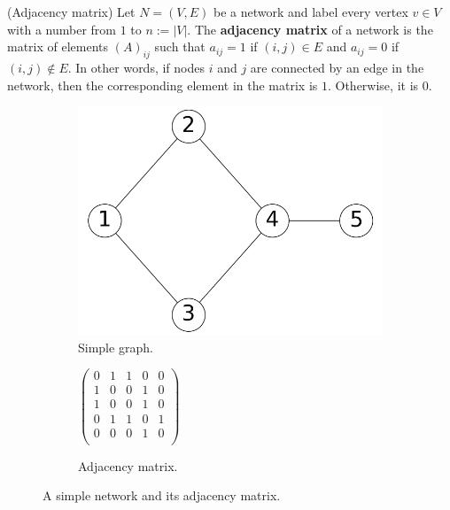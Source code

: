 \begin{definition}{(Adjacency matrix)}
    Let $N = (V, E)$ be a network and label every vertex $v \in V$ with a number from $1$ to $n := |V|$. The \textbf{adjacency matrix} of a network is the matrix of elements $(A)_{ij}$ such that $a_{ij} = 1$ if $(i, j) \in E$ and $a_{ij} = 0$ if $(i, j) \notin E$. In other words, if nodes $i$ and $j$ are connected by an edge in the network, then the corresponding element in the matrix is $1$. Otherwise, it is $0$\label{def:adjacency_matrix}.
\end{definition}

\begin{figure}
    \begin{center}
        \begin{subfigure}[b]{0.45\textwidth}
            \includegraphics[width=\textwidth]{img/simple_example}
            \caption{Simple graph.}
            \label{fig:simple_network}
        \end{subfigure}
        \begin{subfigure}[b]{0.45\textwidth}
            \begin{center}
            $
            \begin{pmatrix}
                0 & 1 & 1 & 0 & 0 \\
                1 & 0 & 0 & 1 & 0 \\
                1 & 0 & 0 & 1 & 0 \\
                0 & 1 & 1 & 0 & 1 \\
                0 & 0 & 0 & 1 & 0 \\
            \end{pmatrix}
            $
            \end{center}
            \caption{Adjacency matrix.}
            \label{fig:simple_network_adjacency_matrix}
        \end{subfigure}
    \end{center}
    \caption{A simple network and its adjacency matrix.}
    \label{fig:simple_network_and_adjacency_matrix}
\end{figure}

